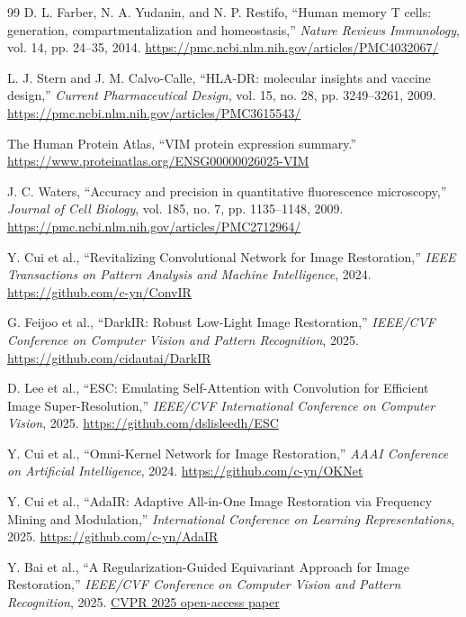 \documentclass[12pt,a4paper,UTF8]{ctexart}
\begin{document}
\begin{thebibliography}{99}
D. L. Farber, N. A. Yudanin, and N. P. Restifo,
``Human memory T cells: generation, compartmentalization and homeostasis,''
\emph{Nature Reviews Immunology}, vol. 14, pp. 24--35, 2014.
\url{https://pmc.ncbi.nlm.nih.gov/articles/PMC4032067/}

L. J. Stern and J. M. Calvo-Calle,
``HLA-DR: molecular insights and vaccine design,''
\emph{Current Pharmaceutical Design}, vol. 15, no. 28, pp. 3249--3261, 2009.
\url{https://pmc.ncbi.nlm.nih.gov/articles/PMC3615543/}

The Human Protein Atlas,
``VIM protein expression summary.''
\url{https://www.proteinatlas.org/ENSG00000026025-VIM}

J. C. Waters,
``Accuracy and precision in quantitative fluorescence microscopy,''
\emph{Journal of Cell Biology}, vol. 185, no. 7, pp. 1135--1148, 2009.
\url{https://pmc.ncbi.nlm.nih.gov/articles/PMC2712964/}

Y. Cui et al.,
``Revitalizing Convolutional Network for Image Restoration,''
\emph{IEEE Transactions on Pattern Analysis and Machine Intelligence}, 2024.
\url{https://github.com/c-yn/ConvIR}

G. Feijoo et al.,
``DarkIR: Robust Low-Light Image Restoration,''
\emph{IEEE/CVF Conference on Computer Vision and Pattern Recognition}, 2025.
\url{https://github.com/cidautai/DarkIR}

D. Lee et al.,
``ESC: Emulating Self-Attention with Convolution for Efficient Image Super-Resolution,''
\emph{IEEE/CVF International Conference on Computer Vision}, 2025.
\url{https://github.com/dslisleedh/ESC}

Y. Cui et al.,
``Omni-Kernel Network for Image Restoration,''
\emph{AAAI Conference on Artificial Intelligence}, 2024.
\url{https://github.com/c-yn/OKNet}

Y. Cui et al.,
``AdaIR: Adaptive All-in-One Image Restoration via Frequency Mining and Modulation,''
\emph{International Conference on Learning Representations}, 2025.
\url{https://github.com/c-yn/AdaIR}

Y. Bai et al.,
``A Regularization-Guided Equivariant Approach for Image Restoration,''
\emph{IEEE/CVF Conference on Computer Vision and Pattern Recognition}, 2025.
\href{https://openaccess.thecvf.com/content/CVPR2025/html/Bai_A_Regularization-Guided_Equivariant_Approach_for_Image_Restoration_CVPR_2025_paper.html}{CVPR 2025 open-access paper}

\end{thebibliography}
\end{document}

